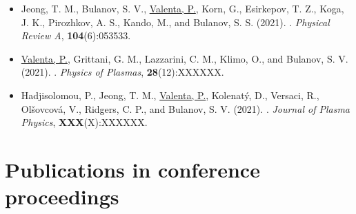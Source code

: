 \documentclass[10pt, a4paper, twoside, openright]{report}
\newcommand{\link}[3][blue]{\href{#2}{\color{#1}{#3}}}%
\begin{document}
\begin{itemize}
	\item Jeong, T. M., Bulanov, S. V., \underline{Valenta, P.}, Korn, G., Esirkepov, T. Z., Koga, J. K., Pirozhkov, A. S., Kando, M., and Bulanov, S. S. (2021). \link{http://dx.doi.org/}{Relativistic-flying laser focus by a laser-produced parabolic plasma mirror}. \textit{Physical Review A}, \textbf{104}(6):053533.
	
	\item \underline{Valenta, P.}, Grittani, G. M., Lazzarini, C. M., Klimo, O., and Bulanov, S. V. (2021). \link{http://dx.doi.org/}{On the electromagnetic-electron rings originating from the interaction of high-power short-pulse laser and underdense plasma}. \textit{Physics of Plasmas}, \textbf{28}(12):XXXXXX.
	
	\item Hadjisolomou, P., Jeong, T. M., \underline{Valenta, P.}, Kolenatý, D., Versaci, R., Olšovcová, V., Ridgers, C. P., and Bulanov, S. V. (2021). \link{http://dx.doi.org/}{Gamma-ray flash in the interaction of a tightly focused single-cycle ultraintense laser pulse with a solid target}. \textit{Journal of Plasma Physics}, \textbf{XXX}(X):XXXXXX.
	
\end{itemize}

\section{Publications in conference proceedings\label{sec:conference_proceedings}}
\end{document}

